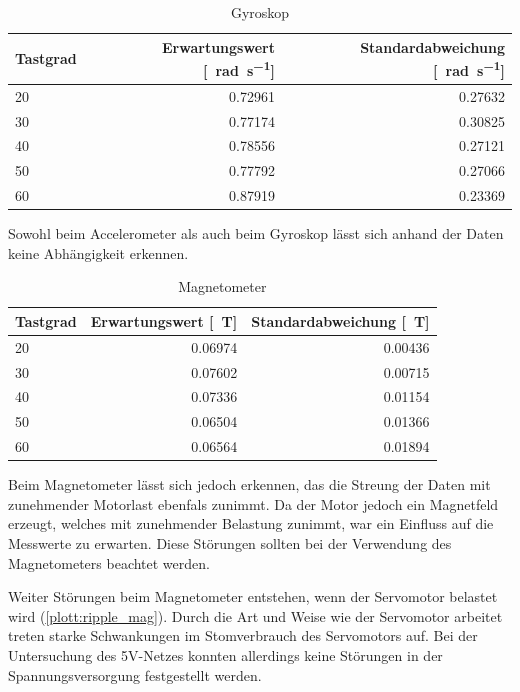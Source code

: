 \begin{table}[H]
  \centering
  \begin{tabularx}{\textwidth}{|X|r|r|}
    \hline
     Tastgrad & Erwartungswert [\SI{}{\radian\per\second}] & Standardabweichung [\SI{}{\radian\per\second}]  \\ \hline \hline
     20 & 0.72961 & 0.27632\\ \hline
     30 & 0.77174 & 0.30825\\ \hline
     40 & 0.78556 & 0.27121\\ \hline
     50 & 0.77792 & 0.27066\\ \hline
     60 & 0.87919 & 0.23369\\ \hline
  \end{tabularx}
  \caption{Gyroskop}%
  \label{tab:gyro}
\end{table}


Sowohl beim Accelerometer als auch beim Gyroskop lässt sich anhand der Daten keine Abhängigkeit erkennen.

\begin{table}[H]
  \centering
  \begin{tabularx}{\textwidth}{|X|r|r|}
    \hline
     Tastgrad & Erwartungswert [\SI{}{\tesla}] & Standardabweichung [\SI{}{\tesla}]  \\ \hline \hline
     20 & 0.06974 & 0.00436\\ \hline
     30 & 0.07602 & 0.00715\\ \hline
     40 & 0.07336 & 0.01154\\ \hline
     50 & 0.06504 & 0.01366\\ \hline
     60 & 0.06564 & 0.01894\\ \hline
  \end{tabularx}
  \caption{Magnetometer}%
  \label{tab:mag}
\end{table}

Beim Magnetometer lässt sich jedoch erkennen, das die Streung der Daten mit zunehmender Motorlast ebenfals zunimmt. Da der Motor jedoch ein Magnetfeld
erzeugt, welches mit zunehmender Belastung zunimmt, war ein Einfluss auf die Messwerte zu erwarten. Diese Störungen sollten bei der Verwendung
des Magnetometers beachtet werden.


Weiter Störungen beim Magnetometer entstehen, wenn der Servomotor belastet wird (\cref{plott:ripple_mag}). Durch die Art und Weise wie der Servomotor arbeitet treten starke Schwankungen im Stomverbrauch des Servomotors auf.
Bei der Untersuchung des 5V-Netzes konnten allerdings keine Störungen in der Spannungsversorgung festgestellt werden.


